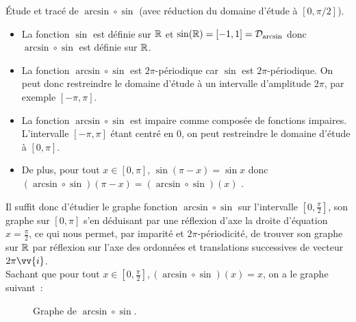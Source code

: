 \documentclass{article}
\renewenvironment{question_kholle}[2][ ]
{
	\subsection{\texorpdfstring{#2}{}}
	\notblank{#1}
	{
		\noindent #1
		\bigbreak
	}
	{}
	\begin{proof}
}
{
	\end{proof}
}
\begin{document}
\begin{question_kholle}{Étude et tracé de $\arcsin\circ\sin$ (avec réduction du domaine d'étude à $[0,\pi/2]$).}\hfill
  \begin{itemize}[label=$*$]
    \item La fonction $\sin$ est définie sur $\mathbb R$ et $\sin(\mathbb R)=[-1,1] = \mathcal{D}_{\arcsin}$ donc $\arcsin\circ\sin$ est définie sur $\mathbb R$.
    \item La fonction $\arcsin\circ\sin$ est $2\pi$-périodique car $\sin$ est $2\pi$-périodique. On peut donc restreindre le domaine d'étude à un intervalle d'amplitude $2\pi$, par exemple $[-\pi,\pi]$.
    \item La fonction $\arcsin\circ\sin$ est impaire comme composée de fonctions impaires. L'intervalle $[-\pi,\pi]$ étant centré en $0$, on peut restreindre le domaine d'étude à $[0,\pi]$.
    \item De plus, pour tout $x\in [0,\pi]$, $\sin(\pi - x)=\sin x$ donc $(\arcsin\circ\sin)(\pi-x)=(\arcsin\circ\sin)(x)$ .
  \end{itemize}
  Il suffit donc d'étudier le graphe fonction $\arcsin\circ\sin$ sur l'intervalle $\left[0,\frac{\pi}{2}\right]$, son graphe sur $[0,\pi]$ s'en déduisant par une réflexion d'axe la droite d'équation $x=\frac{\pi}{2}$, ce qui nous permet, par imparité et $2\pi$-périodicité, de trouver son graphe sur $\mathbb R$ par réflexion sur l'axe des ordonnées et translations successives de vecteur $2\pi\vv{i}$.\\
  Sachant que pour tout $x\in\left[0,\frac{\pi}{2}\right], (\arcsin\circ\sin)(x) = x$, on a le graphe suivant~:

  \begin{figure}[H]
    \centering
    \caption{Graphe de $\arcsin\circ\sin$.}
  \end{figure}
\end{question_kholle}
\end{document}

